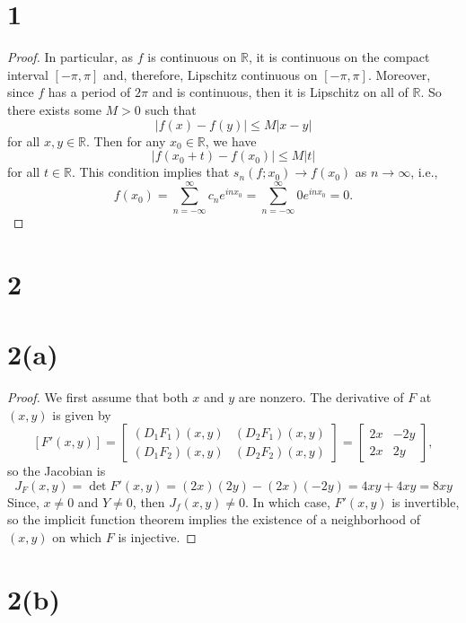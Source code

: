 \documentclass[12pt]{article}
\newcommand{\R}{\mathbb{R}}
\newcommand{\<}{\langle}
\renewcommand{\>}{\rangle}
\newcommand{\mat}[1]{\begin{bmatrix}#1\end{bmatrix}}
\begin{document}
\thispagestyle{title}

\section*{1}

\begin{proof}
    In particular, as $f$ is continuous on $\R$, it is continuous on the compact interval $[-\pi, \pi]$ and, therefore, Lipschitz continuous on $[-\pi, \pi]$. Moreover, since $f$ has a period of $2\pi$ and is continuous, then it is Lipschitz on all of $\R$. So there exists some $M > 0$ such that
    \[
        |f(x) - f(y)| \leq M|x - y|
    \]
    for all $x, y \in \R$. Then for any $x_0 \in \R$, we have
    \[
        |f(x_0 + t) - f(x_0)| \leq M|t|
    \]
    for all $t \in \R$. This condition implies that $s_n(f; x_0) \to f(x_0)$ as $n \to \infty$, i.e.,
    \[
        f(x_0)
            = \sum_{n = -\infty}^{\infty} c_n e^{inx_0}
            = \sum_{n = -\infty}^{\infty} 0 e^{inx_0}
            = 0.
    \]

\end{proof}


\newpage
\section*{2}

\section*{2(a)}

\begin{proof}
    We first assume that both $x$ and $y$ are nonzero. The derivative of $F$ at $(x, y)$ is given by
    \[
        [F'(x, y)]
            = \mat{(D_1F_1)(x, y) & (D_2F_1)(x, y) \\ (D_1F_2)(x, y) & (D_2F_2)(x, y)}
            = \mat{2x & -2y \\ 2x & 2y},
    \]
    so the Jacobian is
    \[
        J_F(x, y)
            = \det F'(x, y) 
            = (2x)(2y) - (2x)(-2y)
            = 4xy + 4xy
            = 8xy
    \]
    Since, $x \ne 0$ and $Y \ne 0$, then $J_f(x, y) \ne 0$. In which case, $F'(x, y)$ is invertible, so the implicit function theorem implies the existence of a neighborhood of $(x, y)$ on which $F$ is injective.

\end{proof}

\section*{2(b)}
\end{document}
